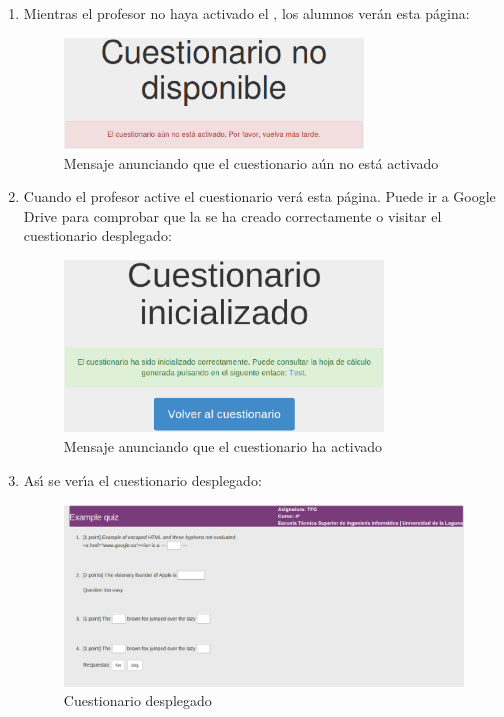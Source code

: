 \begin{enumerate}
  \item Mientras el profesor no haya activado el , los alumnos ver\'an esta p\'agina:
  \begin{figure}[!th]
  \begin{center}
  \includegraphics[width=0.75\textwidth]{images/app6.eps}
  \caption{Mensaje anunciando que el cuestionario a\'un no est\'a activado}
  \label{fig:app6}
  \end{center}
  \end{figure}
  \newpage
  
  \item Cuando el profesor active el cuestionario ver\'a esta p\'agina. Puede ir a Google Drive para comprobar que la  
  se ha creado correctamente o visitar el cuestionario desplegado:
  \begin{figure}[!th]
  \begin{center}
  \includegraphics[width=0.8\textwidth]{images/app7.eps}
  \caption{Mensaje anunciando que el cuestionario ha activado}
  \label{fig:app7}
  \end{center}
  \end{figure}

  \item As\'{\i} se ver\'{\i}a el cuestionario desplegado:
  \begin{figure}[!th]
  \begin{center}
  \includegraphics[width=1\textwidth]{images/app8.eps}
  \caption{Cuestionario desplegado}
  \label{fig:app8}
  \end{center}
  \end{figure}
  \newpage
  

\end{enumerate}
